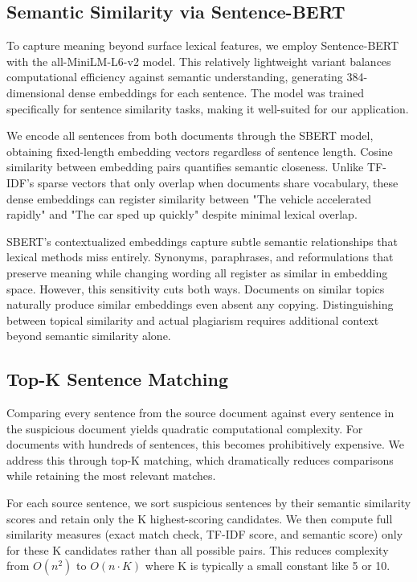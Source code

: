\documentclass[conference]{IEEEtran}
\begin{document}
\subsection{Semantic Similarity via Sentence-BERT}

To capture meaning beyond surface lexical features, we employ Sentence-BERT with the all-MiniLM-L6-v2 model. This relatively lightweight variant balances computational efficiency against semantic understanding, generating 384-dimensional dense embeddings for each sentence. The model was trained specifically for sentence similarity tasks, making it well-suited for our application.

We encode all sentences from both documents through the SBERT model, obtaining fixed-length embedding vectors regardless of sentence length. Cosine similarity between embedding pairs quantifies semantic closeness. Unlike TF-IDF's sparse vectors that only overlap when documents share vocabulary, these dense embeddings can register similarity between "The vehicle accelerated rapidly" and "The car sped up quickly" despite minimal lexical overlap.

SBERT's contextualized embeddings capture subtle semantic relationships that lexical methods miss entirely. Synonyms, paraphrases, and reformulations that preserve meaning while changing wording all register as similar in embedding space. However, this sensitivity cuts both ways. Documents on similar topics naturally produce similar embeddings even absent any copying. Distinguishing between topical similarity and actual plagiarism requires additional context beyond semantic similarity alone.

\subsection{Top-K Sentence Matching}

Comparing every sentence from the source document against every sentence in the suspicious document yields quadratic computational complexity. For documents with hundreds of sentences, this becomes prohibitively expensive. We address this through top-K matching, which dramatically reduces comparisons while retaining the most relevant matches.

For each source sentence, we sort suspicious sentences by their semantic similarity scores and retain only the K highest-scoring candidates. We then compute full similarity measures (exact match check, TF-IDF score, and semantic score) only for these K candidates rather than all possible pairs. This reduces complexity from $O(n^2)$ to $O(n \cdot K)$ where K is typically a small constant like 5 or 10.
\end{document}
